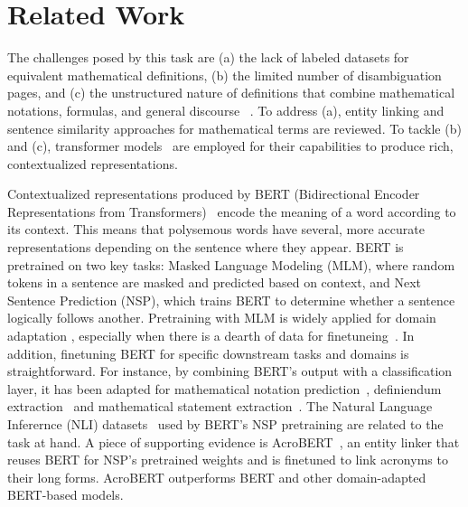 \section{Related Work}
\label{sec:related_work}
The challenges posed by this task are (a) the lack of labeled datasets for equivalent mathematical definitions, (b) the limited number of disambiguation pages, and (c) 
the unstructured nature of definitions that combine mathematical notations, formulas, and general discourse%
~\cite{jiang2023extracting,vanetik2020automatedlstmcnn}.  To address (a), entity linking and sentence similarity approaches for mathematical terms are reviewed. To tackle (b) and (c), transformer models~\cite{vaswani2023attentionneed} are employed for their capabilities to produce rich, contextualized representations.%


Contextualized representations produced by BERT (Bidirectional Encoder Representations from Transformers)~\cite{devlin2019bert} encode the meaning of a word according to its context. This means that polysemous words have several, more accurate representations depending on the sentence where they appear. BERT is pretrained on two key tasks: Masked Language Modeling (MLM), where random tokens in a sentence are masked and predicted based on context, and Next Sentence Prediction (NSP), which trains BERT to determine whether a sentence logically follows another.
Pretraining with MLM is widely applied for domain adaptation 
, especially when there is a dearth of data for finetuneing~\cite{mishraPS21,jiang2022choubert}. In addition, finetuning BERT for specific downstream tasks and domains is straightforward. For instance, by combining BERT's output with a classification layer, it has been adapted for mathematical notation prediction~\cite{jo2021notation}, definiendum extraction~\cite{jiang2023extracting} and mathematical statement extraction~\cite{mishra2024first}. 
The Natural Language Inferernce (NLI) datasets~\cite{bowman-etal-2015-large,williams-etal-2018-broad} used by BERT's NSP pretraining are related to the task at hand. A piece of supporting evidence is AcroBERT~\cite{chen2023gladis}, an entity linker that reuses BERT for NSP's pretrained weights and is finetuned to link acronyms to their long forms. AcroBERT outperforms BERT and other domain-adapted BERT-based models.%

